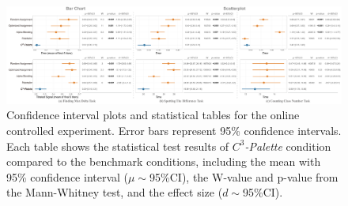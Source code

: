 \documentclass[review,onecolumn]{vgtc}                %
\begin{document}
\begin{figure}[h]
\centering
\includegraphics[width=1\linewidth]{formal-statistics-results.pdf}
\caption{Confidence interval plots and statistical tables for the online controlled experiment. Error bars represent 95\% confidence intervals. Each table shows the statistical test results of \emph{$C^3$-Palette} condition compared to the benchmark conditions, including the mean with 95\% confidence interval ($\mu\sim$95\%CI), the W-value and p-value from the Mann-Whitney test, and the effect size ($d\sim$95\%CI).
}
\vspace*{-5mm}
\label{fig:formalStudy}
\end{figure}
\end{document}
